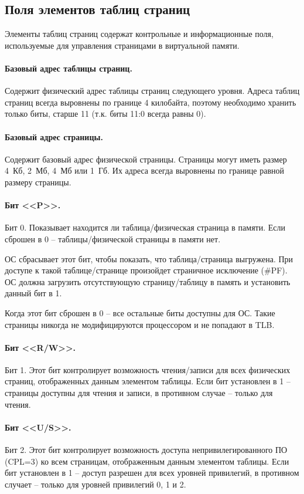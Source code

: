 \subsection{Поля элементов таблиц страниц}
\label{subsec:page_table_fields}
Элементы таблиц страниц содержат контрольные и информационные поля, используемые для управления
страницами в виртуальной памяти.

\paragraph{Базовый адрес таблицы страниц.} Содержит физический адрес таблицы страниц следующего уровня.
Адреса таблиц страниц всегда выровнены по границе 4 килобайта, поэтому необходимо хранить только биты, старше 11
(т.к. биты 11:0 всегда равны 0).

\paragraph{Базовый адрес страницы.} Содержит базовый адрес физической страницы. Страницы могут иметь размер 4~Кб, 2~Мб,
4~Мб или 1~Гб. Их адреса всегда выровнены по границе равной размеру страницы.

\paragraph{Бит <<P>>.} Бит 0. Показывает находится ли таблица/физическая страница в памяти. Если сброшен в 0 --
таблицы/физической страницы в памяти нет.

ОС сбрасывает этот бит, чтобы показать, что таблица/страница выгружена. При доступе к такой таблице/странице произойдет страничное
исключение (\#PF). ОС должна загрузить отсутствующую страницу/таблицу в память и установить данный бит в 1.

Когда этот бит сброшен в 0 -- все остальные биты доступны для ОС. Такие страницы никогда не модифицируются процессором и
не попадают в TLB.

\paragraph{Бит <<R/W>>.} Бит 1. Этот бит контролирует возможность чтения/записи для всех физических страниц, отображенных
данным элементом таблицы. Если бит установлен в 1 -- страницы доступны для чтения и записи, в противном случае --
только для чтения.

\paragraph{Бит <<U/S>>.} Бит 2. Этот бит контролирует возможность доступа непривилегированного ПО (CPL=3) ко всем страницам,
отображенным данным элементом таблицы. Если бит установлен в 1 -- доступ разрешен для всех уровней привилегий,
в противном случает -- только для уровней привилегий 0, 1 и 2.


